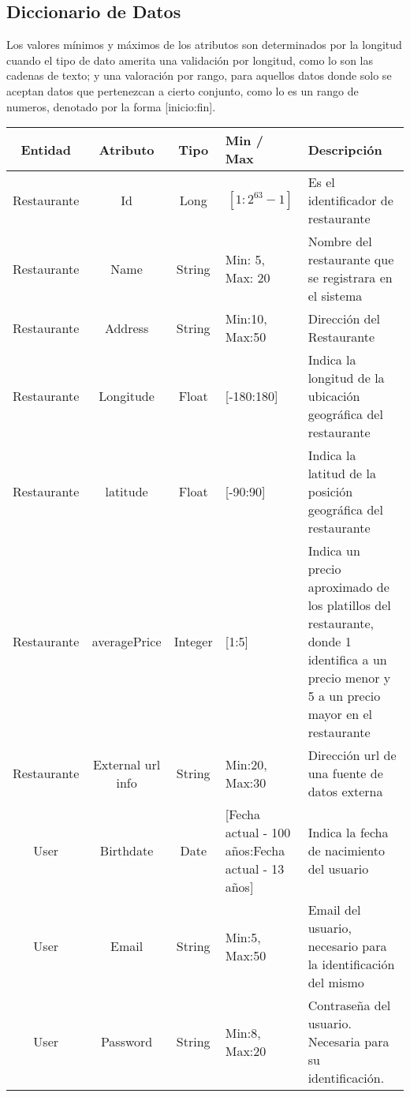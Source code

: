 \begin{landscape}
\section{Diccionario de Datos}
  Los valores mínimos y máximos de los atributos son determinados por la longitud cuando el tipo de dato amerita una validación por longitud, como lo son las cadenas de texto; y una valoración por rango, para aquellos datos donde solo se aceptan datos que pertenezcan a cierto conjunto, como lo es un rango de numeros, denotado por la forma [inicio:fin].
  \begin{table}[h]
    \begin{center}
      \begin{tabular}{| c | c | c | p{3cm} | p{12cm}|} 
        \toprule
        Entidad & Atributo & Tipo & Min / Max & Descripción\\
        \midrule
        Restaurante & Id  & Long & \[[1:2^{63}-1]\] & Es el identificador de restaurante \\
        \midrule
        Restaurante & Name  & String & Min: 5, Max: 20  & Nombre del restaurante que se registrara en el sistema \\
        \midrule
        Restaurante & Address  & String & Min:10, Max:50  & Dirección del Restaurante \\
        \midrule
        Restaurante & Longitude  & Float & [-180:180]  & Indica la longitud de la ubicación geográfica del restaurante \\
        \midrule
        Restaurante & latitude  & Float & [-90:90]  & Indica la latitud de la posición geográfica del restaurante\\
        \midrule
        Restaurante & averagePrice  & Integer & [1:5]  & Indica un precio aproximado de los platillos del restaurante, donde 1 identifica a un precio menor y 5 a un precio mayor en el restaurante\\
        \midrule
        Restaurante & External url info  & String & Min:20, Max:30  & Dirección url de una fuente de datos       		    externa \\
        \midrule
        User & Birthdate  & Date & [Fecha actual - 100 años:Fecha actual - 13 años]  & Indica la fecha de nacimiento del usuario\\
        \midrule
        User & Email  & String & Min:5, Max:50 & Email del usuario, necesario para la identificación del mismo\\
        \midrule
        User & Password  & String & Min:8, Max:20  & Contraseña del usuario. Necesaria para su identificación.\\

\end{tabular}
\end{center}
\end{table}
\end{landscape}
